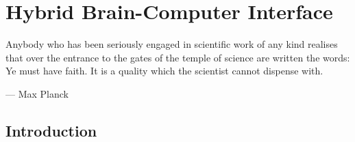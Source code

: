 
\chapter{Hybrid Brain-Computer Interface}
\label{chap:hBCI}
\epigraph{Anybody who has been seriously engaged in scientific work of any kind realises that over the entrance to the gates of the temple of science are written the words: Ye must have faith. It is a quality which the scientist cannot dispense with.}{--- \textup{Max Planck}}

\section{Introduction}%
\label{sec:hBCI-intro}


